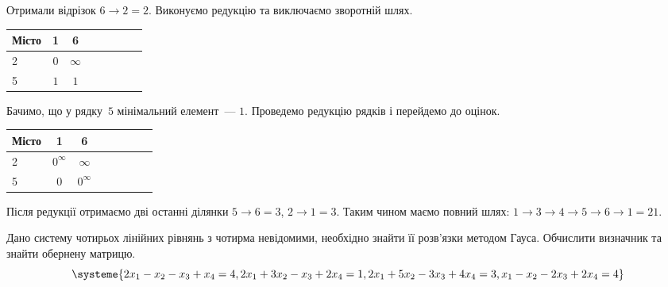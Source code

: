 \documentclass[a4paper,oneside,DIV=12,12pt]{scrartcl}
\begin{document}
\begin{solution}
		Отримали відрізок $6 \to 2 = 2$. Виконуємо редукцію та виключаємо зворотній шлях.
		
		\begin{longtable}[c]{lccccccr}
			\toprule
				Місто & 1 & 6 \\
			\midrule
			\endhead
			\bottomrule
			\endfoot
			
				2     & $0$ & $\infty$\\
				5     & $1$   & $1$\\
		\end{longtable}
		
		Бачимо, що у рядку~$5$ мінімальний елемент~— $1$. Проведемо редукцію рядків і перейдемо до оцінок.
		
		\begin{longtable}[c]{lccccccr}
			\toprule
				Місто & 1 & 6 \\
			\midrule
			\endhead
			\bottomrule
			\endfoot
			
				2     & $0^{\infty}$ & $\infty$\\
				5     & $0$   & $0^{\infty}$\\
		\end{longtable}
		
		Після редукції отримаємо дві останні ділянки $5 \to 6 = 3$, $2 \to 1 = 3$. Таким чином маємо повний шлях: $1 \to 3 \to 4 \to 5 \to 6 \to 1 = 21$.
	\end{solution}
	
	
	\begin{exercise}
		Дано систему чотирьох лінійних рівнянь з чотирма невідомими, необхідно знайти її розв'язки методом Гауса. Обчислити визначник та знайти обернену матрицю.
		\[
			\systeme{
				2x_1 - x_2 - x_3 + x_4 = 4,
				2x_1 + 3x_2 - x_3 + 2x_4 = 1,
				2x_1 + 5x_2 - 3x_3 + 4x_4 = 3,
				x_1 - x_2 - 2x_3 + 2x_4 = 4}
		\]
	\end{exercise}
	
\end{document}
